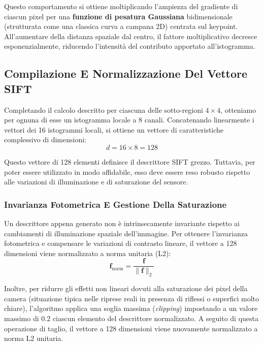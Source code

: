 ﻿\documentclass[11pt, a4paper]{article}
\begin{document}

Questo comportamento si ottiene moltiplicando l'ampiezza del gradiente di ciascun pixel per una \textbf{funzione di pesatura Gaussiana} bidimensionale (strutturata come una classica curva a campana 2D) centrata sul keypoint. All'aumentare della distanza spaziale dal centro, il fattore moltiplicativo decresce esponenzialmente, riducendo l'intensità del contributo apportato all'istogramma.

\subsection{Compilazione E Normalizzazione Del Vettore SIFT}

Completando il calcolo descritto per ciascuna delle sotto-regioni $4 \times 4$, otteniamo per ognuna di esse un istogramma locale a 8 canali. Concatenando linearmente i vettori dei 16 istogrammi locali, si ottiene un vettore di caratteristiche complessivo di dimensioni:
\[ \boxed{d = 16 \times 8 = 128} \]

Questo vettore di 128 elementi definisce il descrittore SIFT grezzo. Tuttavia, per poter essere utilizzato in modo affidabile, esso deve essere reso robusto rispetto alle variazioni di illuminazione e di saturazione del sensore.

\subsubsection{Invarianza Fotometrica E Gestione Della Saturazione}
Un descrittore appena generato non è intrinsecamente invariante rispetto ai cambiamenti di illuminazione spaziale dell'immagine. Per ottenere l'invarianza fotometrica e compensare le variazioni di contrasto lineare, il vettore a 128 dimensioni viene normalizzato a norma unitaria (L2):
\[ \bm{f}_{\text{norm}} = \frac{\bm{f}}{\lVert\bm{f}\rVert_2} \]

Inoltre, per ridurre gli effetti non lineari dovuti alla saturazione dei pixel della camera (situazione tipica nelle riprese reali in presenza di riflessi o superfici molto chiare), l'algoritmo applica una soglia massima (\emph{clipping}) impostando a un valore massimo di $0.2$ ciascun elemento del descrittore normalizzato. A seguito di questa operazione di taglio, il vettore a 128 dimensioni viene nuovamente normalizzato a norma L2 unitaria.
\end{document}
